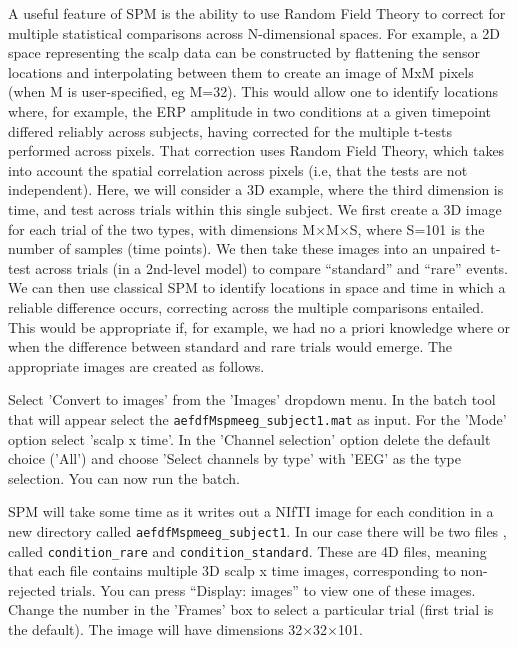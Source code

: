 A useful feature of SPM is the ability to use Random Field Theory to correct for multiple statistical comparisons across N-dimensional spaces. For example, a 2D space representing the scalp data can be constructed by flattening the sensor locations and interpolating between them to create an image of MxM pixels (when M is user-specified, eg M=32). This would allow one to identify locations where, for example, the ERP amplitude in two conditions at a given timepoint differed reliably across subjects, having corrected for the multiple t-tests performed across pixels. That correction uses Random Field Theory, which takes into account the spatial correlation across pixels (i.e, that the tests are not independent).
Here, we will consider a 3D example, where the third dimension is time, and test across trials within this single subject. We first create a 3D image for each trial of the two types, with dimensions M$\times$M$\times$S, where S=101 is the number of samples (time points). We then take these images into an unpaired t-test across trials (in a 2nd-level model) to compare ``standard'' and ``rare'' events. We can then use classical SPM to identify locations in space and time in which a reliable difference occurs, correcting across the multiple comparisons entailed. This would be appropriate if, for example, we had no a priori knowledge where or when the difference between standard and rare trials would emerge. The appropriate images are created as follows.

Select 'Convert to images' from the 'Images' dropdown menu. In the batch tool that will appear select the  \texttt{aefdfMspmeeg\_subject1.mat} as input. For the 'Mode' option select 'scalp x time'.  In the 'Channel selection' option delete the default choice ('All') and choose 'Select channels by type' with 'EEG' as the type selection. You can now run the batch.

SPM will take some time as it writes out a NIfTI image for each condition in a new directory called \texttt{aefdfMspmeeg\_subject1}. In our case there will be two files ,  called \texttt{condition\_rare} and \texttt{condition\_standard}. These are 4D files, meaning that each file contains multiple 3D scalp x time images, corresponding to non-rejected trials. You can press ``Display: images'' to view one of these images. Change the number in the 'Frames' box to select a particular trial  (first trial is the default). The image will have dimensions 32$\times$32$\times$101.

